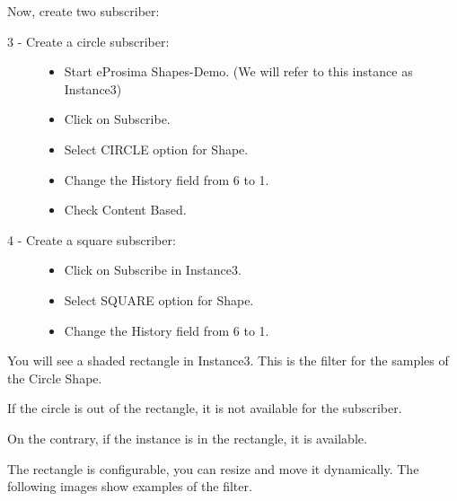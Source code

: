\documentclass[letterpaper,10pt,english]{sphinxmanual}
\begin{document}
Now, create two subscriber:
\begin{description}
\item[{3 - Create a circle subscriber:}] \leavevmode\begin{itemize}
\item {} 
Start eProsima Shapes-Demo. (We will refer to this instance as Instance3)

\item {} 
Click on Subscribe.

\item {} 
Select CIRCLE option for Shape.

\item {} 
Change the History field from 6 to 1.

\item {} 
Check Content Based.

\end{itemize}

\item[{4 - Create a square subscriber:}] \leavevmode\begin{itemize}
\item {} 
Click on Subscribe in Instance3.

\item {} 
Select SQUARE option for Shape.

\item {} 
Change the History field from 6 to 1.

\end{itemize}

\end{description}

You will see a shaded rectangle in Instance3. This is the filter for the samples of the Circle Shape.

If the circle is out of the rectangle, it is not available for the subscriber.


On the contrary, if the instance is in the rectangle, it is available.


The rectangle is configurable, you can resize and move it dynamically. The following images show examples of the filter.
\end{document}
